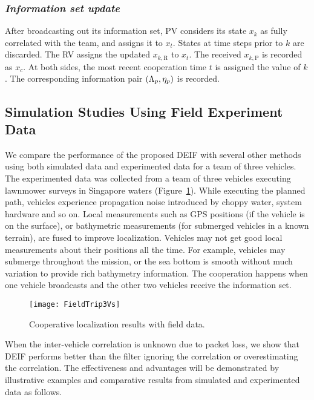 \subsubsection*{\textit{Information set update}}
  
After broadcasting out its information set, PV considers its state ${x}_k$ as fully correlated with the team, and assigns it to $x_t$. States at time steps prior to $k$ are discarded. The RV assigns the updated ${x}_{k,\text{R}}$ to ${x}_t$. The received ${x}_{k,\text{P}}$ is recorded as ${x}_c$. At both sides, the most recent cooperation time $t$ is assigned the value of $k$. The corresponding information pair $({\Lambda}_p,{\bf\eta}_p)$ is recorded. 

\subsection{Simulation Studies Using Field Experiment Data} 

We compare the performance of the proposed DEIF with several other methods using both simulated data and experimented data for a team of three vehicles. The experimented data was collected from a team of three vehicles executing lawnmower surveys in Singapore waters (Figure~\ref{fig:FieldTrip3Vs}). While executing the planned path, vehicles experience propagation noise introduced by choppy water, system hardware and so on. Local measurements such as GPS positions (if the vehicle is on the surface), or bathymetric measurements (for submerged vehicles in a known terrain), are fused to improve localization. Vehicles may not get good local measurements about their positions all the time. For example, vehicles may submerge throughout the mission, or the sea bottom is smooth without much variation to provide rich bathymetry information. The cooperation happens when one vehicle broadcasts and the other two vehicles receive the information set. %

\begin{figure}[htpb]
\centering
\texttt{[image: FieldTrip3Vs]}
\caption{Cooperative localization results with field data.}
\label{fig:FieldTrip3Vs}
\end{figure}

When the inter-vehicle correlation is unknown due to packet loss, we show that DEIF performs better than the filter ignoring the correlation or overestimating the correlation. The effectiveness and advantages will be demonstrated by illustrative examples and comparative results from simulated and experimented data as follows.

